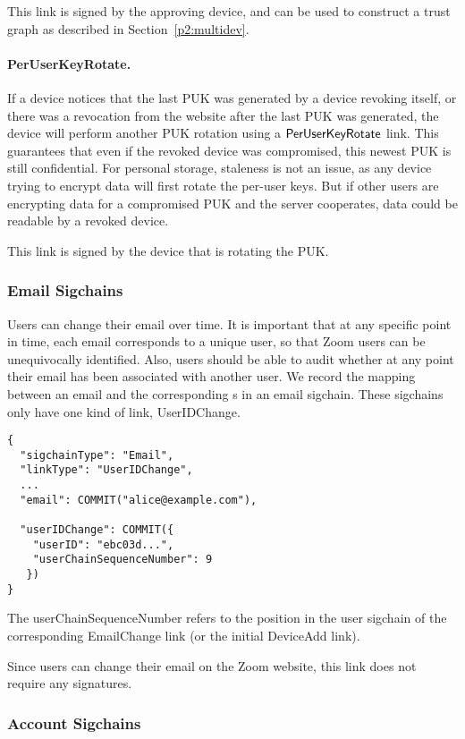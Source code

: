 This link is signed by the approving device, and can be used to construct a trust graph as described
in Section~\ref{p2:multidev}.

\paragraph{PerUserKeyRotate.} If a device notices that the last PUK was generated by a device
revoking itself, or there was a revocation from the website after the last PUK was generated, the
device will perform another PUK rotation using a $\mathsf{PerUserKeyRotate}{}$ link. This guarantees that
even if the revoked device was compromised, this newest PUK is still confidential. For personal
storage, staleness is not an issue, as any device trying to encrypt data will first rotate the
per-user keys. But if other users are encrypting data for a compromised PUK and the server
cooperates, data could be readable by a revoked device.

This link is signed by the device that is rotating the PUK.

\subsubsection{Email Sigchains}

Users can change their email over time. It is important that at any specific point in time, each email corresponds to a unique user, so that Zoom users can be unequivocally identified. Also,
users should be able to audit whether at any point their email has been associated with another
user. We record the mapping between an email and the corresponding {\userID}s in an email sigchain.
These sigchains only have one kind of link, \textsf{UserIDChange}.

\begin{Verbatim}
{
  "sigchainType": "Email",
  "linkType": "UserIDChange",
  ...
  "email": COMMIT("alice@example.com"),

  "userIDChange": COMMIT({
    "userID": "ebc03d...",
    "userChainSequenceNumber": 9
   })
}
\end{Verbatim}

The \textsf{userChainSequenceNumber} refers to the position in the user sigchain of the corresponding
\textsf{EmailChange} link (or the initial \textsf{DeviceAdd} link).

Since users can change their email on the Zoom website, this link does not require any signatures.

\subsubsection{Account Sigchains}

